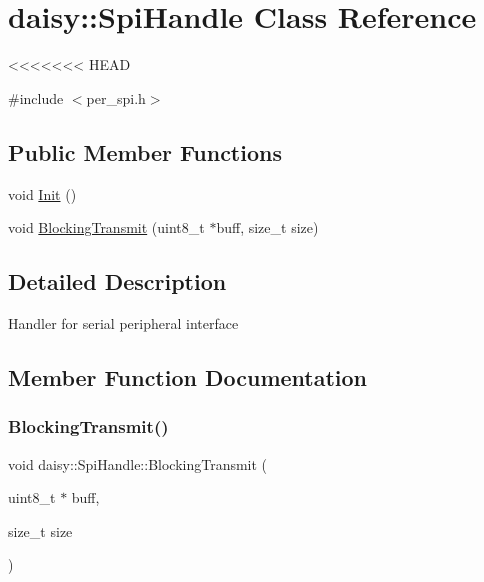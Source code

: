 \hypertarget{classdaisy_1_1_spi_handle}{}\section{daisy\+:\+:Spi\+Handle Class Reference}
\label{classdaisy_1_1_spi_handle}
<<<<<<< HEAD


{\ttfamily \#include $<$per\+\_\+spi.\+h$>$}

\subsection*{Public Member Functions}
\begin{DoxyCompactItemize}
\item 
void \hyperlink{classdaisy_1_1_spi_handle_a567b2e40b20e11acfc3c1029ca9777bf}{Init} ()
\item 
void \hyperlink{classdaisy_1_1_spi_handle_a99adb49a6d7c8583d565dc450610af25}{Blocking\+Transmit} (uint8\+\_\+t $\ast$buff, size\+\_\+t size)
\end{DoxyCompactItemize}


\subsection{Detailed Description}
Handler for serial peripheral interface 

\subsection{Member Function Documentation}
\mbox{\label{classdaisy_1_1_spi_handle_a99adb49a6d7c8583d565dc450610af25}} 
\subsubsection{\texorpdfstring{Blocking\+Transmit()}{BlockingTransmit()}}
{\footnotesize\ttfamily void daisy\+::\+Spi\+Handle\+::\+Blocking\+Transmit (\begin{DoxyParamCaption}\item[{uint8\+\_\+t $\ast$}]{buff,  }\item[{size\+\_\+t}]{size }\end{DoxyParamCaption})}

